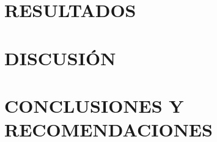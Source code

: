\documentclass[12pt]{report}
\begin{document}

\pagebreak
\chapter{RESULTADOS}
\vspace{-3em}




\pagebreak
\chapter{DISCUSIÓN}
\vspace{-3em}



\pagebreak
\chapter{CONCLUSIONES Y RECOMENDACIONES}

\end{document}
